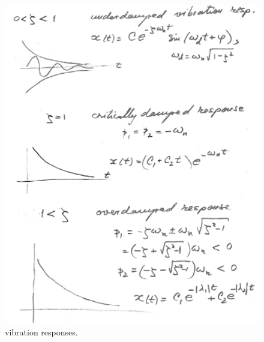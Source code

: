 \documentclass[12pt,letter]{article}
\numberwithin{ex}{section} %
\numberwithin{re}{section} %
\numberwithin{equation}{section}	%
\begin{document}
\begin{figure}[H]
	\centering
	\includegraphics[width=6.5in]{../figures/vibration_responses.png}
	\caption{vibration responses.}
\end{figure}
\end{document}
